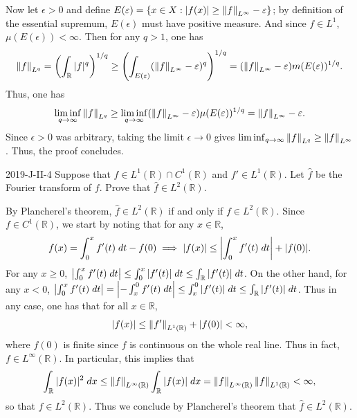 \documentclass{article}
\begin{document}
	Now let $\epsilon > 0$ and define $E(\varepsilon) = \{x \in X: |f(x)| \geq \left\Vert f \right\Vert_{L^\infty}- \varepsilon\}$; by definition of the essential supremum, $E(\epsilon)$ must have positive measure. And since $f \in L^1$, $\mu(E(\epsilon)) < \infty$. Then for any $q > 1$, one has 
	\begin{equation*}
		\left\Vert f \right\Vert_{L^q} = \left(\int_{\mathbb{R}}|f|^q\right)^{1/q} \geq \left(\int_{E(\varepsilon)}(\left\Vert f \right\Vert_{L^\infty} - \varepsilon)^q\right)^{1/q} =(\left\Vert f \right\Vert_{L^\infty} - \varepsilon)m(E(\varepsilon))^{1/q}. 
	\end{equation*}
	Thus, one has 
	\begin{equation*}
		\liminf_{q \to \infty}\left\Vert f \right\Vert_{L^q} \geq \liminf_{q \to \infty}(\left\Vert f \right\Vert_{L^\infty} - \varepsilon)\mu(E(\varepsilon))^{1/q} = \left\Vert f \right\Vert_{L^\infty} - \varepsilon. 
	\end{equation*}
	Since $\epsilon > 0$ was arbitrary, taking the limit $\epsilon \to 0$ gives $\liminf_{q \to \infty}\left\Vert f \right\Vert_{L^q} \geq \left\Vert f \right\Vert_{L^\infty}$. Thus, the proof concludes. 
	
	\begin{prb}{2019-J-II-4}
		Suppose that $f \in L^{1}(\mathbb{R}) \cap C^{1}(\mathbb{R})$ and $f' \in L^{1}(\mathbb{R})$. Let $\hat{f}$ be the Fourier transform of $f$. Prove that $\hat{f} \in L^{2}(\mathbb{R})$. 
	\end{prb}
	By Plancherel's theorem, $\hat{f} \in L^{2}(\mathbb{R})$ if and only if $f \in L^{2}(\mathbb{R})$. Since $f \in C^{1}(\mathbb{R})$, we start by noting that for any $x \in \mathbb{R}$, 
	\begin{equation*}
		f(x) = \int_{0}^{x}f'(t)\;dt - f(0) \implies |f(x)| \leq \left| \int_{0}^{x}f'(t)\;dt \right| + |f(0)|. 
	\end{equation*}
	For any $x \geq 0$, $\left| \int_{0}^{x}f'(t)\;dt \right| \leq \int_{0}^{x}|f'(t)|\;dt \leq \int_{\mathbb{R}}|f'(t)|\;dt$. On the other hand, for any $x < 0$, $\left| \int_{0}^{x}f'(t)\;dt \right| = \left| -\int_{x}^{0}f'(t)\;dt \right| \leq \int_{x}^{0}|f'(t)|\;dt \leq \int_{\mathbb{R}}|f'(t)|\;dt$. Thus in any case, one has that for all $x \in \mathbb{R}$,
	\begin{equation*}
		|f(x)| \leq \left\Vert f' \right\Vert_{L^{1}(\mathbb{R})} + |f(0)| < \infty, 
	\end{equation*} 
	where $f(0)$ is finite since $f$ is continuous on the whole real line. Thus in fact, $f \in L^{\infty}(\mathbb{R})$. In particular, this implies that 
	\begin{equation*}
		\int_{\mathbb{R}}|f(x)|^2\;dx \leq \left\Vert f \right\Vert_{L^{\infty}(\mathbb{R})}\int_{\mathbb{R}}|f(x)|\;dx = \left\Vert f \right\Vert_{L^{\infty}(\mathbb{R})}\left\Vert f \right\Vert_{L^{1}(\mathbb{R})} < \infty, 
	\end{equation*}
	so that $f \in L^{2}(\mathbb{R})$. Thus we conclude by Plancherel's theorem that $\hat{f} \in L^{2}(\mathbb{R})$. 
	
\end{document}
